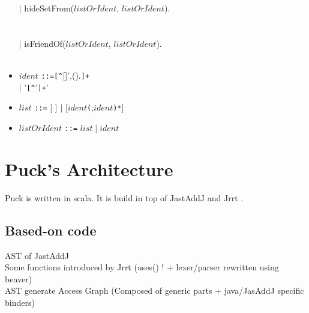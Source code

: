 \documentclass[]{article}
\begin{document}
\begin{itemize}
\begin{tabbing}
		\>$|$ hideSetFrom($listOrIdent$, $listOrIdent$).\\	
		\>\color{light-gray}{hideSetFrom(elementSet, interlopers)}\\
		\\
		
		\>$|$ isFriendOf($listOrIdent$, $listOrIdent$).\\
		\>\color{light-gray}{isFriendOf(scopeSet, beFriended)}\\
		
	\end{tabbing}

	\item \begin{tabbing}
		$ident$ \verb|::|\=\verb|=[^|[]',().\verb|]+|\\		
		\>$|$ '\verb|[^|'\verb|]+|'
	\end{tabbing}
	
	\item $list$ \verb|::=| [ ] $|$ [$ident$\verb|(|,$ident$\verb|)*|]\\		
	
	\item $listOrIdent$ \verb|::=| $list\; |\; ident$\\		
		
\end{itemize}


\section{Puck's Architecture}
Puck is written in scala. 
It is build in top of JastAddJ \cite{ekman2007jastaddj} and Jrrt \cite{jrrt, schafer2012accessibility}.
\subsection{Based-on code}
AST of JastAddJ\\
Some functions introduced by Jrrt (uses() ! + lexer/parser rewritten using beaver)\\
AST generate Access Graph (Composed of generic parts + java/JasAddJ specific binders)
\end{document}
